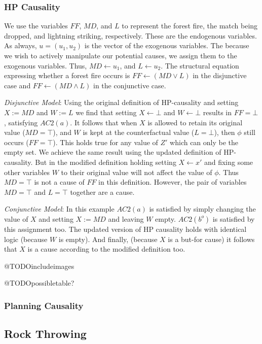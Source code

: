 \documentclass{article}
\theoremstyle{plain}
\theoremstyle{definition}
\begin{document}
\subsubsection*{HP Causality}
We use the variables $FF$, $MD$, and $L$ to represent the forest fire, the match being dropped, and lightning striking, respectively. These are the endogenous variables. As always, $u=(u_1, u_2)$ is the vector of the exogenous variables. The because we wish to actively manipulate our potential causes, we assign them to the exogenous variables. Thus, $MD \leftarrow u_1$, and $L \leftarrow u_2$. The structural equation expressing whether a forest fire occurs is $FF\leftarrow(MD \lor L)$ in the disjunctive case and $FF \leftarrow (MD \land L)$ in the conjunctive case.

\textit{Disjunctive Model}: Using the original definition of HP-causality and setting $X:=MD$ and $W:=L$ we find that setting $X \leftarrow \bot$ and $W \leftarrow \bot$ results in $FF=\bot$, satisfying $AC2(a)$. It follows that when $X$  is allowed to retain its original value ($MD=\top$), and $W$ is kept at the counterfactual value ($L=\bot$), then $\phi$ still occurs ($FF=\top$). This holds true for any value of $Z'$ which can only be the empty set. We achieve the same result using the updated definition of HP-causality. But in the modified definition holding setting $X \leftarrow x'$ and fixing some other variables $W$ to their original value will not affect the value of $\phi$. Thus $MD=\top$ is not a cause of $FF$ in this definition. However, the pair of variables $MD=\top$ and $L=\top$ together are a cause.

\textit{Conjunctive Model}: In this example $AC2(a)$ is satisfied by simply changing the value of $X$ and setting $X:=MD$ and leaving $W$ empty. $AC2(b^o)$ is satisfied by this assignment too. The updated version of HP causality holds with identical logic (because $W$ is empty). And finally, (because $X$ is a but-for cause) it follows that $X$ is a cause according to the modified definition too.

@TODOincludeimages

@TODOpossibletable?


\subsubsection*{Planning Causality}


\subsection{Rock Throwing}
\end{document}
